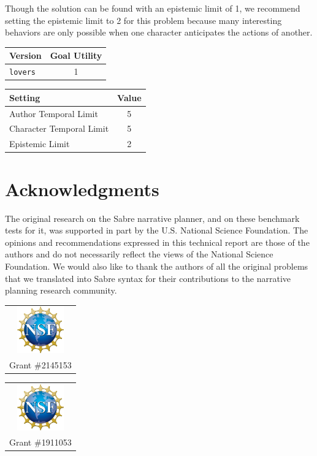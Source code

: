 \documentclass{nilreport}
\begin{document}
\medskip{}

\noindent Though the solution can be found with an epistemic limit
of 1, we recommend setting the epistemic limit to 2 for this problem
because many interesting behaviors are only possible when one character
anticipates the actions of another.

\medskip{}

\begin{center}
\begin{tabular}[t]{|l|c|}
\hline 
\textbf{Version} & \textbf{Goal Utility}\tabularnewline
\hline 
\hline 
\texttt{lovers} & 1\tabularnewline
\hline 
\end{tabular}\textbf{\quad{}}%
\begin{tabular}[t]{|l|c|}
\hline 
\textbf{Setting} & \textbf{Value}\tabularnewline
\hline 
\hline 
Author Temporal Limit & 5\tabularnewline
\hline 
Character Temporal Limit & 5\tabularnewline
\hline 
Epistemic Limit & 2\tabularnewline
\hline 
\end{tabular}
\par\end{center}

\section{Acknowledgments}

The original research on the Sabre narrative planner, and on these
benchmark tests for it, was supported in part by the U.S. National
Science Foundation. The opinions and recommendations expressed in
this technical report are those of the authors and do not necessarily
reflect the views of the National Science Foundation. We would also
like to thank the authors of all the original problems that we translated
into Sabre syntax for their contributions to the narrative planning
research community.

\medskip{}

\begin{center}
\begin{tabular}{c}
\includegraphics[width=2cm]{nsflogo}\tabularnewline
Grant \#2145153\tabularnewline
\end{tabular}\quad{}%
\begin{tabular}{c}
\includegraphics[width=2cm]{nsflogo}\tabularnewline
Grant \#1911053\tabularnewline
\end{tabular}
\par\end{center}




\end{document}
